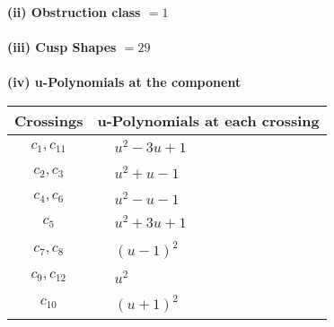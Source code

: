 \documentclass[1p]{elsarticle_modified}
\theoremstyle{definition}
\begin{document}
\flushleft \textbf{(ii) Obstruction class $= 1$}\\~\\
\flushleft \textbf{(iii) Cusp Shapes $= 29$}\\~\\
\newpage\renewcommand{\arraystretch}{1}
\flushleft \textbf{(iv) u-Polynomials at the component}\newline \\
\begin{tabular}{m{50pt}|m{274pt}}
Crossings & \hspace{64pt}u-Polynomials at each crossing \\
\hline $$\begin{aligned}c_{1},c_{11}\end{aligned}$$&$\begin{aligned}
&u^2-3 u+1
\end{aligned}$\\
\hline $$\begin{aligned}c_{2},c_{3}\end{aligned}$$&$\begin{aligned}
&u^2+u-1
\end{aligned}$\\
\hline $$\begin{aligned}c_{4},c_{6}\end{aligned}$$&$\begin{aligned}
&u^2- u-1
\end{aligned}$\\
\hline $$\begin{aligned}c_{5}\end{aligned}$$&$\begin{aligned}
&u^2+3 u+1
\end{aligned}$\\
\hline $$\begin{aligned}c_{7},c_{8}\end{aligned}$$&$\begin{aligned}
&(u-1)^2
\end{aligned}$\\
\hline $$\begin{aligned}c_{9},c_{12}\end{aligned}$$&$\begin{aligned}
&u^2
\end{aligned}$\\
\hline $$\begin{aligned}c_{10}\end{aligned}$$&$\begin{aligned}
&(u+1)^2
\end{aligned}$\\
\hline
\end{tabular}\\~\\
\end{document}

